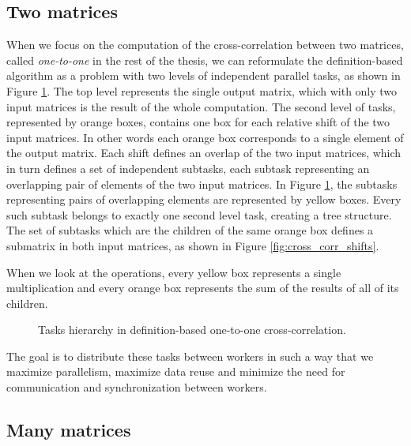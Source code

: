 \subsection{Two matrices}
When we focus on the computation of the cross-correlation between two matrices, called \textit{one-to-one} in the rest of the thesis, we can reformulate the definition-based algorithm as a problem with two levels of independent parallel tasks, as shown in Figure \ref{fig:cross_corr_one_to_one_tasks}. The top level represents the single output matrix, which with only two input matrices is the result of the whole computation. The second level of tasks, represented by orange boxes, contains one box for each relative shift of the two input matrices. In other words each orange box corresponds to a single element of the output matrix. Each shift defines an overlap of the two input matrices, which in turn defines a set of independent subtasks, each subtask representing an overlapping pair of elements of the two input matrices. In Figure \ref{fig:cross_corr_one_to_one_tasks}, the subtasks representing pairs of overlapping elements are represented by yellow boxes. Every such subtask belongs to exactly one second level task, creating a tree structure. The set of subtasks which are the children of the same orange box defines a submatrix in both input matrices, as shown in Figure \ref{fig:cross_corr_shifts}.


When we look at the operations, every yellow box represents a single multiplication and every orange box represents the sum of the results of all of its children. 

\begin{figure}[ht]
	\fontsize{5}{6}\selectfont
	\centering
	\def\svgwidth{0.6\textwidth}
	
	\caption{Tasks hierarchy in definition-based one-to-one cross-correlation.}
	\label{fig:cross_corr_one_to_one_tasks}
\end{figure}

The goal is to distribute these tasks between workers in such a way that we maximize parallelism, maximize data reuse and minimize the need for communication and synchronization between workers.

\subsection{Many matrices}

